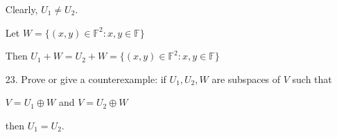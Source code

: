 \documentclass{article}
\begin{document}
\begin{enumerate}[nolistsep]
		Clearly, $U_1 \neq U_2$.
		
		Let $W = \{(x, y) \in \mathbb{F}^2 : x, y \in \mathbb{F}\}$
		
		Then $U_1 + W = U_2 + W = \{(x, y) \in \mathbb{F}^2 : x, y \in \mathbb{F}\}$
		
		\item[23.] Prove or give a counterexample: if $U_1, U_2, W$ are subspaces of $V$ such that
		
		\centerline{$V = U_1 \oplus W$ and $V = U_2 \oplus W$}
		
		then $U_1 = U_2$.
		
	\end{enumerate}
\end{document}
